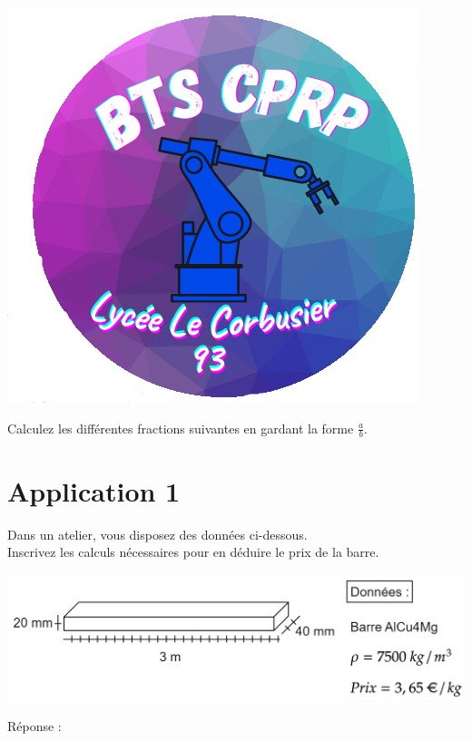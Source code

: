 \documentclass[12pt,a4paper]{article} %
\begin{document}
\begin{center}
\includegraphics[scale=0.4]{logo.png}
\end{center}

\begin{exo} Calculez les différentes fractions suivantes en gardant la forme $\frac{a}{b}$.\end{exo}









\section{Application 1}
\begin{tcolorbox}[colback=blue!5!white,colframe=black!75!black] 
Dans un atelier, vous disposez des données ci-dessous.\\
Inscrivez les calculs nécessaires pour en déduire le prix de la barre.
\end{tcolorbox}
\includegraphics[scale=1]{Barre.png}


Réponse : 


\end{document}
